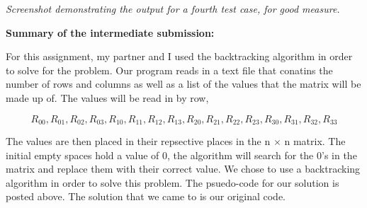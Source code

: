 \documentclass{article}
\begin{document}
\textit{Screenshot demonstrating the output for a fourth test case, for good measure.}

\pagebreak

\textbf{Summary of the intermediate submission:}

\bigskip

\noindent For this assignment, my partner and I used the backtracking algorithm in order
to solve for the problem. Our program reads in a text file that conatins the 
number of rows and columns as well as a list of the values that the matrix will
be made up of. The values will be read in by row,

\[R_{00},R_{01},R_{02},R_{03},R_{10},R_{11},R_{12},R_{13},R_{20},R_{21},R_{22},R_{23},R_{30},R_{31},R_{32},R_{33}\]

\noindent The values are then placed in their repsective places in the n $\times$ n matrix.
The initial empty spaces hold a value of 0, the algorithm will search for the 0's 
in the matrix and replace them with their correct value. We chose to use a backtracking
algorithm in order to solve this problem. The psuedo-code for our solution is posted above.
The solution that we came to is our original code.
\end{document}
